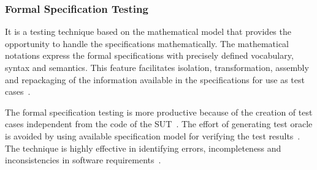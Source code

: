 \subsubsection{Formal Specification Testing}
It is a testing technique based on the mathematical model that provides the opportunity to handle the specifications mathematically. The mathematical notations express the formal specifications with precisely defined vocabulary, syntax and semantics. This feature facilitates isolation, transformation, assembly and repackaging of the information available in the specifications for use as test cases~\cite{donat1997automating}. 

The formal specification testing is more productive because of the creation of test cases independent from the code of the SUT~\cite{gaudel2010software}. The effort of generating test oracle is avoided by using available specification model for verifying the test results~\cite{bertolino2007software}. The technique is highly effective in identifying errors, incompleteness and inconsistencies in software requirements~\cite{sommerville2013software}.
  







